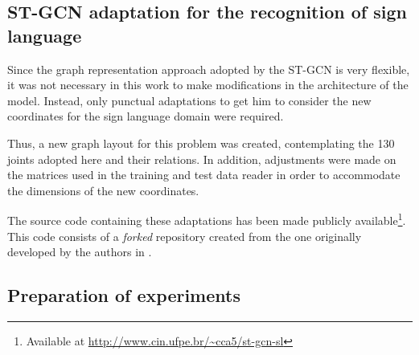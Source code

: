 \subsection{ST-GCN adaptation for the recognition of sign language} %
\label{sec:adaptacao-st-gcn}

Since the graph representation approach adopted by the ST-GCN is very flexible, it was not necessary in this work to make modifications in the architecture of the model. Instead, only punctual adaptations to get him to consider the new coordinates for the sign language domain were required.


Thus, a new graph layout for this problem was created, contemplating the 130 joints adopted here and their relations. In addition, adjustments were made on the matrices used in the training and test data reader in order to accommodate the dimensions of the new coordinates.


The source code containing these adaptations has been made publicly available\footnote{
    Available at \url{http://www.cin.ufpe.br/~cca5/st-gcn-sl}
}. This code consists of a \textit{forked} repository created from the one originally developed by the authors in \cite{st-gcn-2018}.




\subsection{Preparation of experiments} %
\label{experimentos}

